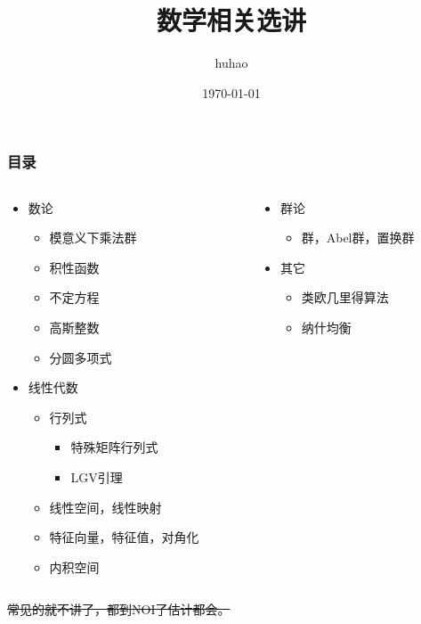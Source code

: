 \documentclass[10pt]{beamer}
\begin{document}
	\title{数学相关选讲}
	\date{\today}
	\author{huhao}
	\maketitle
	\clearpage
	\begin{frame}
		\frametitle{目录}
		\begin{columns}
			\begin{column}{5.5cm}
				
				\begin{itemize}
					\item 数论
					\begin{itemize}
						\item 模意义下乘法群
						\item 积性函数
						\item 不定方程
						\item 高斯整数
						\item 分圆多项式
					\end{itemize}
					\item 线性代数
					\begin{itemize}
						\item 行列式
						\begin{itemize}
							\item 特殊矩阵行列式
							\item LGV引理
						\end{itemize}
						\item 线性空间，线性映射
						\item 特征向量，特征值，对角化
						\item 内积空间
					\end{itemize}
				\end{itemize}
			\end{column}
			\begin{column}{5.5cm}
				\begin{itemize}
					\item 群论
					\begin{itemize}
						\item 群，Abel群，置换群
					\end{itemize}
					\item 其它
					\begin{itemize}
						\item 类欧几里得算法
						\item 纳什均衡
					\end{itemize}
				\end{itemize}
			\end{column}

		\end{columns}

		\sout{常见的就不讲了，都到NOI了估计都会。}
	\end{frame}
\end{document}
